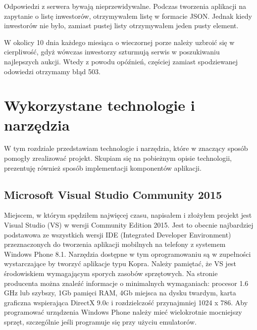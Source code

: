 \documentclass[a4paper,twoside,titlepage,openright]{book}
\begin{document}
Odpowiedzi z serwera bywają nieprzewidywalne. Podczas tworzenia aplikacji na zapytanie o listę inwestorów, otrzymywałem listę w formacie JSON. Jednak kiedy inwestorów nie było, zamiast pustej listy otrzymywałem jeden pusty element. 

W okolicy 10 dnia każdego miesiąca o wieczornej porze należy uzbroić się w cierpliwość, gdyż wówczas inwestorzy szturmują serwis w poszukiwaniu najlepszych aukcji. Wtedy z powodu opóźnień, częściej zamiast spodziewanej odowiedzi otrzymamy błąd 503.


\chapter{Wykorzystane technologie i narzędzia}
W tym rozdziale przedstawiam technologie i narzędzia, które w znaczący sposób pomogły zrealizować projekt. Skupiam się na pobieżnym opisie technologii, prezentuję również sposób implementacji komponentów aplikacji.

\section{Microsoft Visual Studio Community 2015}
Miejscem, w którym spędziłem najwięcej czasu, napisałem i złożyłem projekt jest Visual Studio (VS) w wersji Community Edition 2015. Jest to obecnie najbardziej podstawowa ze wszystkich wersji IDE (Integrated Developer Environment) przeznaczonych do tworzenia aplikacji mobilnych na telefony z systemem Windows Phone 8.1. Narzędzia dostępne w tym oprogramowaniu są w zupełności wystarczające by tworzyć aplikacje typu Kopra. Należy pamiętać, że VS jest środowiskiem wymagającym sporych zasobów sprzętowych. Na stronie producenta \cite{vs} można znaleźć informacje o minimalnych wymaganiach: procesor 1.6 GHz lub szybszy, 1Gb pamięci RAM, 4Gb miejsca na dysku twardym, karta graficzna wspierająca DirectX 9.0c i rozdzielczość przynajmniej 1024 x 786. Aby programować urządzenia Windows Phone należy mieć wielokrotnie mocniejszy sprzęt, szczególnie jeśli programuje się przy użyciu emulatorów.
\end{document}
